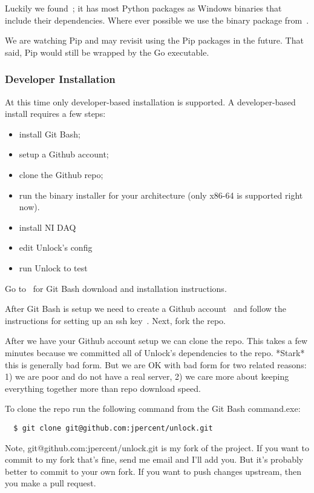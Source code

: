 \documentclass[11pt]{article}
\begin{document}
Luckily we found~\cite{winpythonpackages}; it has most Python packages as Windows binaries that include their dependencies.  Where ever possible we use the binary package from~\cite{winpythonpackages}.  

We are watching Pip and may revisit using the Pip packages in the future.  That said, Pip would still be wrapped by the Go executable.

\subsubsection{Developer Installation}

At this time only developer-based installation is supported.  A developer-based install requires a few steps:
\begin{itemize}
\item install Git Bash;
\item setup a Github account;
\item clone the Github repo;
\item run the binary installer for your architecture (only x86-64 is supported right now).
\item install NI DAQ
\item edit Unlock's config
\item run Unlock to test
\end{itemize}

Go to~\cite{gitbash} for Git Bash download and installation instructions.  

After Git Bash is setup we need to create a Github account~\cite{github} and follow the instructions for setting up an ssh key~\cite{sshkey}.  Next, fork the repo.

After we have your Github account setup we can clone the repo.  This takes a few minutes because we committed all of Unlock's dependencies to the repo.  *Stark* this is generally bad form.  But we are OK with bad form for two related reasons: 1) we are poor and do not have a real server, 2) we care more about keeping everything together more than repo download speed.

To clone the repo run the following command from the Git Bash command.exe:
\begin{verbatim}  
  $ git clone git@github.com:jpercent/unlock.git
\end{verbatim}

Note, git@github.com:jpercent/unlock.git is my fork of the project.  If you want to commit to my fork that's fine, send me email and I'll add you.  But it's probably better to commit to your own fork.  If you want to push changes upstream, then you make a pull request.  
\end{document}
